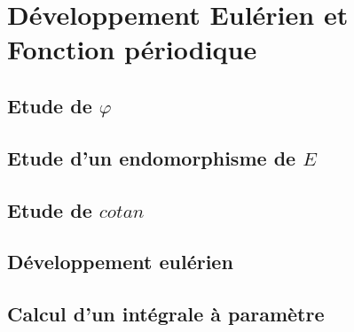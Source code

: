 \section{Développement Eulérien et Fonction périodique}

\subsection{Etude de $\varphi$}



\subsection{Etude d’un endomorphisme de $E$}


\subsection{Etude de $cotan$}


\subsection{Développement eulérien}


\subsection{Calcul d'un intégrale à paramètre}

